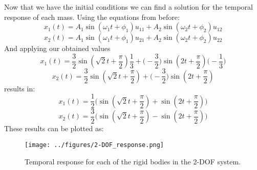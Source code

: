 \documentclass[12pt,letter]{article}
\begin{document}
\begin{example}
	Now that we have the initial conditions we can find a solution for the temporal response of each mass. Using the equations from before:
	\begin{equation}
		x_1(t) = A_1 \sin (\omega_1 t + \phi_1 )u_{11} + A_2 \sin (\omega_2 t + \phi_2 )u_{12}
	\end{equation}
	\begin{equation}
		x_2(t) = A_1 \sin (\omega_1 t + \phi_1 )u_{21} + A_2 \sin (\omega_2 t + \phi_2 )u_{22}
	\end{equation}
	And applying our obtained values
	\begin{equation}
		x_1(t) = \frac{3}{2} \sin (\sqrt{2} t + \frac{\pi}{2} )\frac{1}{3} + \bigg(-\frac{3}{2}\bigg) \sin (2 t + \frac{\pi}{2} ) \bigg(-\frac{1}{3}\bigg)
	\end{equation}
	\begin{equation}
		x_2(t) = \frac{3}{2} \sin (\sqrt{2} t + \frac{\pi}{2} ) + \bigg(-\frac{3}{2}\bigg) \sin (2 t + \frac{\pi}{2} )
	\end{equation}
	results in:
	\begin{equation}
		x_1(t) = \frac{1}{2} \bigg(  \sin (\sqrt{2} t + \frac{\pi}{2} ) + \sin (2 t + \frac{\pi}{2} ) \bigg)
	\end{equation}
	\begin{equation}
		x_2(t) = \frac{3}{2}  \bigg( \sin (\sqrt{2} t + \frac{\pi}{2} ) -\sin (2 t + \frac{\pi}{2} ) \bigg)
	\end{equation}
	These results can be plotted as:
	\begin{figure}[H]
		\centering
		\texttt{[image: ../figures/2-DOF\_response.png]}
		\caption{Temporal response for each of the rigid bodies in the 2-DOF system.}
	\end{figure}
	\end{example}
	
	\pagebreak
	
	
	
\end{document}
